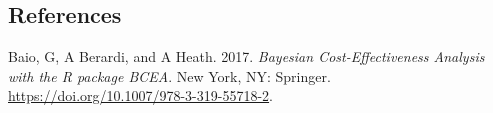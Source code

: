\documentclass[]{article}
\begin{document}
\hypertarget{references}{%
\subsection*{References}\label{references}}

\hypertarget{refs}{}
\leavevmode\hypertarget{ref-Baioetal:2017}{}%
Baio, G, A Berardi, and A Heath. 2017. \emph{Bayesian Cost-Effectiveness
Analysis with the R package BCEA}. New York, NY: Springer.
\url{https://doi.org/10.1007/978-3-319-55718-2}.
\end{document}

